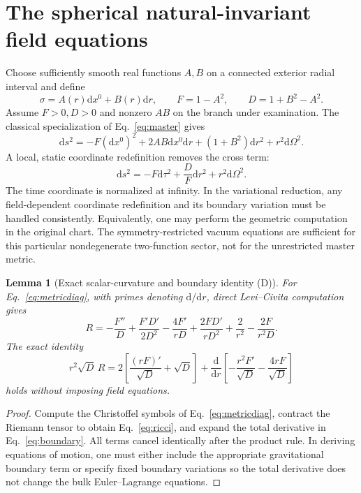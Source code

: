 \documentclass[11pt,a4paper]{article}
\newtheorem{lemma}[theorem]{Lemma}
\theoremstyle{remark}
\newcommand{\dd}{\mathrm d}
\newcommand{\eref}[1]{Eq.~\eqref{#1}}
\begin{document}
\section{The spherical natural-invariant field equations}\label{sec:spherical}
Choose sufficiently smooth real functions $A,B$ on a connected exterior radial interval and define
\begin{equation}\label{eq:AB}
 \sigma=A(r)\dd x^0+B(r)\dd r,\qquad F=1-A^2,\qquad D=1+B^2-A^2.
\end{equation}
Assume $F>0,D>0$ and nonzero $AB$ on the branch under examination. The classical specialization of \eref{eq:master} gives
\begin{equation}\label{eq:metricnondiag}
\dd s^2=-F(\dd x^0)^2+2AB\dd x^0\dd r+(1+B^2)\dd r^2+r^2\dd\Omega^2.
\end{equation}
A local, static coordinate redefinition removes the cross term:
\begin{equation}\label{eq:metricdiag}
\boxed{\dd s^2=-F\dd\tau^2+\frac{D}{F}\dd r^2+r^2\dd\Omega^2.}
\end{equation}
The time coordinate is normalized at infinity. In the variational reduction, any field-dependent coordinate redefinition and its boundary variation must be handled consistently. Equivalently, one may perform the geometric computation in the original chart. The symmetry-restricted vacuum equations are sufficient for this particular nondegenerate two-function sector, not for the unrestricted master metric.

\begin{lemma}[Exact scalar-curvature and boundary identity (D)]\label{lem:EH}
For \eref{eq:metricdiag}, with primes denoting $\dd/\dd r$, direct Levi--Civita computation gives
\begin{equation}\label{eq:ricci}
R=-\frac{F''}{D}+\frac{F'D'}{2D^2}-\frac{4F'}{rD}
 +\frac{2FD'}{rD^2}+\frac{2}{r^2}-\frac{2F}{r^2D}.
\end{equation}
The exact identity
\begin{equation}\label{eq:boundary}
\boxed{r^2\sqrt D\,R=2\left[\frac{(rF)'}{\sqrt D}+\sqrt D\right]
+\frac{\dd}{\dd r}\left[-\frac{r^2F'}{\sqrt D}-\frac{4rF}{\sqrt D}\right]}
\end{equation}
holds without imposing field equations.
\end{lemma}
\begin{proof}
Compute the Christoffel symbols of \eref{eq:metricdiag}, contract the Riemann tensor to obtain \eref{eq:ricci}, and expand the total derivative in \eref{eq:boundary}. All terms cancel identically after the product rule. In deriving equations of motion, one must either include the appropriate gravitational boundary term or specify fixed boundary variations so the total derivative does not change the bulk Euler--Lagrange equations.
\end{proof}
\end{document}
